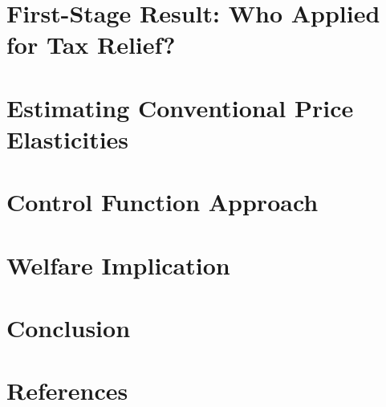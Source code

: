 \documentclass[
  ignorenonframetext,
  aspectratio=169,
]{beamer}
\begin{document}
\hypertarget{first-stage-result-who-applied-for-tax-relief}{%
\section{First-Stage Result: Who Applied for Tax Relief?}\label{first-stage-result-who-applied-for-tax-relief}}

\hypertarget{estimating-conventional-price-elasticities}{%
\section{Estimating Conventional Price Elasticities}\label{estimating-conventional-price-elasticities}}

\hypertarget{control-function-approach}{%
\section{Control Function Approach}\label{control-function-approach}}

\hypertarget{welfare-implication}{%
\section{Welfare Implication}\label{welfare-implication}}

\hypertarget{conclusion}{%
\section{Conclusion}\label{conclusion}}

\hypertarget{references}{%
\section*{References}\label{references}}
\end{document}
